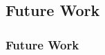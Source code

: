 \documentclass[10pt]{beamer}
\begin{document}
\subsection{Future Work}
\begin{frame}
\frametitle{Future Work}
\end{frame}


%
%
%




\end{document}
